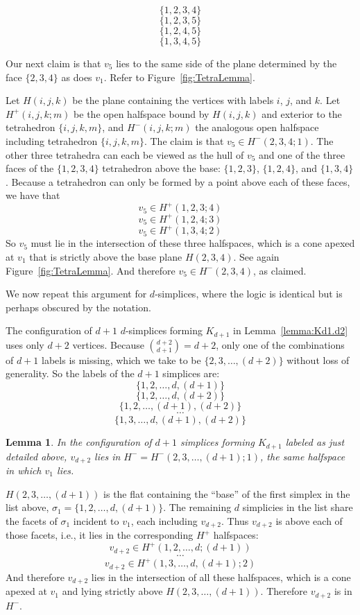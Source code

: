 \pdfoutput=1  \documentclass[]{article}
\newcommand{\ABox}{
\raisebox{3pt}{\framebox[6pt]{\rule{6pt}{0pt}}}
}
\newenvironment{proof}{{\bf Proof:}}{\hfill\ABox}
\newtheorem{lemma}{Lemma}
\newcommand{\lemlab}[1]{\label{lemma:#1}}
\newcommand{\lemref}[1]{\ref{lemma:#1}}
\newcommand{\figref}[1]{\ref{fig:#1}}
\def\s{{\sigma}}
\begin{document}
$$\{  1, 2, 3, 4  \}$$
$$\{  1, 2, 3, 5  \}$$
$$\{  1, 2, 4, 5  \}$$
$$\{  1, 3, 4, 5  \}$$

Our next claim is that $v_5$ lies to the same
side of the plane determined by the face $\{ 2,3,4 \}$ as does $v_1$.
Refer to Figure~\figref{TetraLemma}.

Let $H(i,j,k)$ be the plane containing the vertices with labels
$i$, $j$, and $k$.
Let $H^+(i,j,k;m)$ be the open halfspace bound by $H(i,j,k)$
and exterior to the tetrahedron $\{i,j,k,m\}$,
and $H^-(i,j,k;m)$ the analogous open halfspace including tetrahedron $\{i,j,k,m\}$.
The claim is that $v_5 \in H^-(2,3,4;1)$. The other three tetrahedra can each be viewed as the hull of $v_5$ and
one of the three faces of the $\{1, 2, 3, 4 \}$ tetrahedron above
the base: $\{1,2,3\}$, $\{1,2,4\}$, and $\{1,3,4\}$.
Because a tetrahedron can only be formed by a point above
each of these faces, we have that
$$v_5 \in H^+(1,2,3;4)$$
$$v_5 \in H^+(1,2,4;3)$$
$$v_5 \in H^+(1,3,4;2)$$
So $v_5$ must lie in the intersection of these three halfspaces,
which is a cone apexed at $v_1$ that is strictly above
the base plane $H(2,3,4)$.  See again Figure~\figref{TetraLemma}.
And therefore $v_5 \in H^-(2,3,4)$,
as claimed.

We now repeat this argument for $d$-simplices, where
the logic is identical but is perhaps obscured by the notation.

The configuration of $d+1$ $d$-simplices forming $K_{d+1}$ in
Lemma~\lemref{Kd1.d2} uses only $d+2$ vertices.
Because $\binom{d+2}{d+1}=d+2$, only one of the combinations
of $d+1$ labels is missing, which we take to be 
$\{2,3,\ldots,(d{+}2)\}$ without loss of generality.
So the labels of the $d+1$ simplices are:
$$\{ 1,2,\ldots,d,(d{+}1) \}$$
$$\{ 1,2,\ldots,d,(d{+}2) \}$$
$$\{ 1,2,\ldots,(d{+}1),(d{+}2) \}$$
$$\cdots$$
$$\{ 1,3,\ldots,d,(d{+}1),(d{+}2) \}$$

\begin{lemma}
In the configuration of $d+1$ simplices forming $K_{d+1}$ labeled as
just detailed above, $v_{d+2}$ lies in $H^- = H^-(2,3,\ldots,(d{+}1);1)$,
the same halfspace in which $v_1$ lies.
\lemlab{Kd1}
\end{lemma}
\begin{proof}
$H(2,3,\ldots,(d{+}1) )$ is the flat containing the ``base'' of the first simplex in the
list above, $\s_1 = \{ 1,2,\ldots,d,(d{+}1) \}$. The remaining $d$ simplicies in the list share the facets of $\s_1$
incident to $v_1$, each including $v_{d+2}$.
Thus $v_{d+2}$ is above each of those facets, i.e., it lies in the
corresponding $H^+$ halfspaces:
$$v_{d+2} \in H^+( 1,2,\ldots,d; (d{+}1) )$$
$$\cdots$$
$$v_{d+2} \in H^+(1,3,\ldots,d,(d{+}1); 2  )$$
And therefore $v_{d+2}$ lies in the intersection of all these halfspaces,
which is a cone apexed at $v_1$ and lying strictly above $H(2,3,\ldots,(d{+}1))$.
Therefore $v_{d+2}$ is in $H^-$.
\end{proof}
\end{document}
